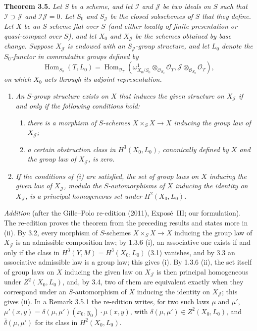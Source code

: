\medskip
\noindent{}\textbf{Theorem 3.5.}
\textit{Let \(S\) be a scheme, and let \(\mathscr I\) and
\(\mathscr J\) be two ideals on \(S\) such that
\(\mathscr I\supset\mathscr J\) and
\(\mathscr I\mathscr J=0\). Let \(S_0\) and \(S_{\mathscr J}\) be the
closed subschemes of \(S\) that they define. Let \(X\) be an
\(S\)-scheme flat over \(S\) (and either locally of finite presentation
or quasi-compact over \(S\)), and let \(X_0\) and
\(X_{\mathscr J}\) be the schemes obtained by base change. Suppose
\(X_{\mathscr J}\) is endowed with an \(S_{\mathscr J}\)-group
structure, and let \(L_0\) denote the \(S_0\)-functor in commutative
groups defined by}
\[
 \operatorname{Hom}_{S_0}(T,L_0)
 =\operatorname{Hom}_{\mathscr O_T}
 \left(
  \omega^1_{X_0/S_0}\otimes_{\mathscr O_{S_0}}\mathscr O_T,
  \mathscr J\otimes_{\mathscr O_{S_0}}\mathscr O_T
 \right),
\]
\textit{on which \(X_0\) acts through its adjoint representation.}
\begin{enumerate}
\item[\SGAInlineRefTarget{sga3:iii:theorem:3-5:item:i}(i)] \textit{An \(S\)-group structure exists on \(X\) that
induces the given structure on \(X_{\mathscr J}\) if and only if the
following conditions hold:}
  \begin{enumerate}
  \item[\((i_1)\)] \textit{there is a morphism of \(S\)-schemes
  \(X\times_S X\to X\) inducing the group law of
  \(X_{\mathscr J}\);}
  \item[\((i_2)\)] \textit{a certain obstruction class in
  \(H^3(X_0,L_0)\), canonically defined by \(X\) and the group law of
  \(X_{\mathscr J}\), is zero.}
  \end{enumerate}
\item[\SGAInlineRefTarget{sga3:iii:theorem:3-5:item:ii}(ii)] \textit{If the conditions of (i) are satisfied, the set
of group laws on \(X\) inducing the given law of \(X_{\mathscr J}\), modulo the
\(S\)-automorphisms of \(X\) inducing the identity on \(X_{\mathscr J}\), is a
principal homogeneous set under \(H^2(X_0,L_0)\).}
\end{enumerate}

\emph{Addition} (after the Gille--Polo re-edition (2011), Exposé~III; our
formulation). The re-edition proves the theorem from the preceding results
and states more in (ii). By 3.2, every morphism of \(S\)-schemes
\(X\times_SX\to X\) inducing the group law of \(X_{\mathscr J}\) is an
admissible composition law; by 1.3.6 (i), an associative one exists if and
only if the class in \(H^3(Y,M)=H^3(X_0,L_0)\) (3.1) vanishes, and by 3.3 an
associative admissible law is a group law; this gives (i). By 1.3.6 (ii),
the set itself of group laws on \(X\) inducing the given law on
\(X_{\mathscr J}\) is then principal homogeneous under \(Z^2(X_0,L_0)\), and,
by 3.4, two of them are equivalent exactly when they correspond under an
\(S\)-automorphism of \(X\) inducing the identity on \(X_{\mathscr J}\); this
gives (ii). In a Remark 3.5.1 the re-edition writes, for two such laws \(\mu\)
and \(\mu'\), \(\mu'(x,y)=\delta(\mu,\mu')(x_0,y_0)\cdot\mu(x,y)\), with
\(\delta(\mu,\mu')\in Z^2(X_0,L_0)\), and \(\bar\delta(\mu,\mu')\) for its
class in \(H^2(X_0,L_0)\).

